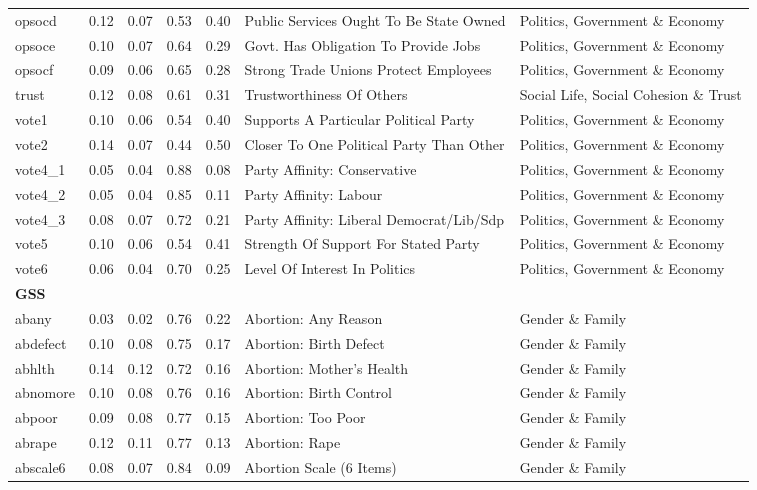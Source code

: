 \begin{longtable}{l|rrrrll}
opsocd & 0.12 & 0.07 & 0.53 & 0.40 & Public Services Ought To Be State Owned & Politics, Government \& Economy \\ 
opsoce & 0.10 & 0.07 & 0.64 & 0.29 & Govt. Has Obligation To Provide Jobs & Politics, Government \& Economy \\ 
opsocf & 0.09 & 0.06 & 0.65 & 0.28 & Strong Trade Unions Protect Employees & Politics, Government \& Economy \\ 
trust & 0.12 & 0.08 & 0.61 & 0.31 & Trustworthiness Of Others & Social Life, Social Cohesion \& Trust \\ 
vote1 & 0.10 & 0.06 & 0.54 & 0.40 & Supports A Particular Political Party & Politics, Government \& Economy \\ 
vote2 & 0.14 & 0.07 & 0.44 & 0.50 & Closer To One Political Party Than Other & Politics, Government \& Economy \\ 
vote4\_1 & 0.05 & 0.04 & 0.88 & 0.08 & Party Affinity: Conservative & Politics, Government \& Economy \\ 
vote4\_2 & 0.05 & 0.04 & 0.85 & 0.11 & Party Affinity: Labour & Politics, Government \& Economy \\ 
vote4\_3 & 0.08 & 0.07 & 0.72 & 0.21 & Party Affinity: Liberal Democrat/Lib/Sdp & Politics, Government \& Economy \\ 
vote5 & 0.10 & 0.06 & 0.54 & 0.41 & Strength Of Support For Stated Party & Politics, Government \& Economy \\ 
vote6 & 0.06 & 0.04 & 0.70 & 0.25 & Level Of Interest In Politics & Politics, Government \& Economy \\ 
\midrule
\multicolumn{7}{l}{\textbf{GSS}} \\ 
\midrule
abany & 0.03 & 0.02 & 0.76 & 0.22 & Abortion: Any Reason & Gender \& Family \\ 
abdefect & 0.10 & 0.08 & 0.75 & 0.17 & Abortion: Birth Defect & Gender \& Family \\ 
abhlth & 0.14 & 0.12 & 0.72 & 0.16 & Abortion: Mother's Health & Gender \& Family \\ 
abnomore & 0.10 & 0.08 & 0.76 & 0.16 & Abortion: Birth Control & Gender \& Family \\ 
abpoor & 0.09 & 0.08 & 0.77 & 0.15 & Abortion: Too Poor & Gender \& Family \\ 
abrape & 0.12 & 0.11 & 0.77 & 0.13 & Abortion: Rape & Gender \& Family \\ 
abscale6 & 0.08 & 0.07 & 0.84 & 0.09 & Abortion Scale (6 Items) & Gender \& Family \\ 

\end{longtable}
